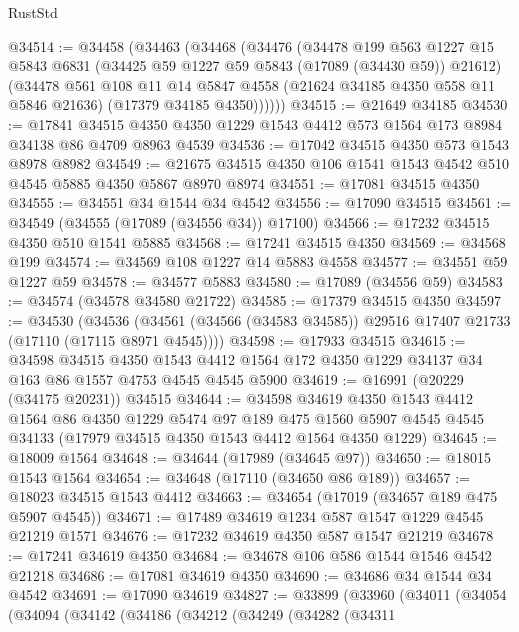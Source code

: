 \begin{lexlean}{RustStd}
\begin{coremodule}
@34514 := @34458
    (@34463
      (@34468
        (@34476
          (@34478
            @199
            @563
            @1227
            @15
            @5843
            @6831
            (@34425 @59 @1227 @59 @5843 (@17089 (@34430 @59)) @21612)
            (@34478
              @561
              @108
              @11
              @14
              @5847
              @4558
              (@21624 @34185 @4350 @558 @11 @5846 @21636)
              (@17379 @34185 @4350))))))
@34515 := @21649 @34185
@34530 := @17841
    @34515
    @4350
    @4350
    @1229
    @1543
    @4412
    @573
    @1564
    @173
    @8984
    @34138
    @86
    @4709
    @8963
    @4539
@34536 := @17042 @34515 @4350 @573 @1543 @8978 @8982
@34549 := @21675 @34515 @4350 @106 @1541 @1543 @4542 @510 @4545 @5885 @4350 @5867 @8970 @8974
@34551 := @17081 @34515 @4350
@34555 := @34551 @34 @1544 @34 @4542
@34556 := @17090 @34515
@34561 := @34549 (@34555 (@17089 (@34556 @34)) @17100)
@34566 := @17232 @34515 @4350 @510 @1541 @5885
@34568 := @17241 @34515 @4350
@34569 := @34568 @199
@34574 := @34569 @108 @1227 @14 @5883 @4558
@34577 := @34551 @59 @1227 @59
@34578 := @34577 @5883
@34580 := @17089 (@34556 @59)
@34583 := @34574 (@34578 @34580 @21722)
@34585 := @17379 @34515 @4350
@34597 := @34530
    (@34536 (@34561 (@34566 (@34583 @34585)) @29516 @17407 @21733 (@17110 (@17115 @8971 @4545))))
@34598 := @17933 @34515
@34615 := @34598
    @34515
    @4350
    @1543
    @4412
    @1564
    @172
    @4350
    @1229
    @34137
    @34
    @163
    @86
    @1557
    @4753
    @4545
    @4545
    @5900
@34619 := @16991 (@20229 (@34175 @20231)) @34515
@34644 := @34598
    @34619
    @4350
    @1543
    @4412
    @1564
    @86
    @4350
    @1229
    @5474
    @97
    @189
    @475
    @1560
    @5907
    @4545
    @4545
    @34133
    (@17979 @34515 @4350 @1543 @4412 @1564 @4350 @1229)
@34645 := @18009 @1564
@34648 := @34644 (@17989 (@34645 @97))
@34650 := @18015 @1543 @1564
@34654 := @34648 (@17110 (@34650 @86 @189))
@34657 := @18023 @34515 @1543 @4412
@34663 := @34654 (@17019 (@34657 @189 @475 @5907 @4545))
@34671 := @17489 @34619 @1234 @587 @1547 @1229 @4545 @21219 @1571
@34676 := @17232 @34619 @4350 @587 @1547 @21219
@34678 := @17241 @34619 @4350
@34684 := @34678 @106 @586 @1544 @1546 @4542 @21218
@34686 := @17081 @34619 @4350
@34690 := @34686 @34 @1544 @34 @4542
@34691 := @17090 @34619
@34827 := @33899
    (@33960
      (@34011
        (@34054
          (@34094
            (@34142
              (@34186
                (@34212
                  (@34249
                    (@34282
                      (@34311

\end{coremodule}
\end{lexlean}
